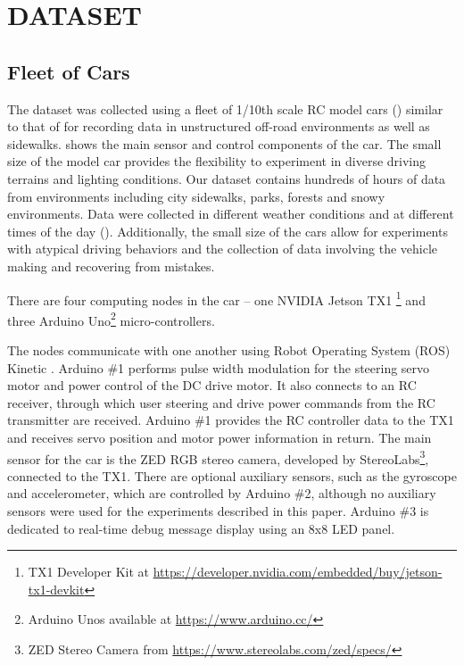 \section{DATASET}
\label{sec:dataset}

\subsection{Fleet of Cars}
The dataset was collected using a fleet of 1/10th scale RC model cars () similar to that of \cite{intel_paper, williams2017information, giusti2016machine, muller2006off, muller2013real, krasheninnikov2017autonomous} for recording data in unstructured off-road environments as well as sidewalks.  shows the main sensor and control components of the car. The small size of the model car provides the flexibility to experiment in diverse driving terrains and lighting conditions. Our dataset contains hundreds of hours of data from environments including city sidewalks, parks, forests and snowy environments. Data were collected in different weather conditions and at different times of the day (). Additionally, the small size of the cars allow for experiments with atypical driving behaviors and the collection of data involving the vehicle making and recovering from mistakes.

There are four computing nodes in the car -- one NVIDIA Jetson TX1 \footnote{ TX1 Developer Kit at \url{https://developer.nvidia.com/embedded/buy/jetson-tx1-devkit}} and three Arduino Uno\footnote{Arduino Unos available at \url{https://www.arduino.cc/}} micro-controllers.

The nodes communicate with one another using Robot Operating System (ROS) Kinetic \cite{quigley2009ros}. Arduino \#1 performs pulse width modulation for the steering servo motor and power control of the DC drive motor. It also connects to an RC receiver, through which user steering and drive power commands from the RC transmitter are received. Arduino \#1 provides the RC controller data to the TX1 and receives servo position and motor power information in return. The main sensor for the car is the ZED RGB stereo camera, developed by StereoLabs\footnote{ ZED Stereo Camera from \url{https://www.stereolabs.com/zed/specs/}}, connected to the TX1. There are optional auxiliary sensors, such as the gyroscope and accelerometer, which are controlled by Arduino \#2, although no auxiliary sensors were used for the experiments described in this paper. Arduino \#3 is dedicated to real-time debug message display using an 8x8 LED panel. 

